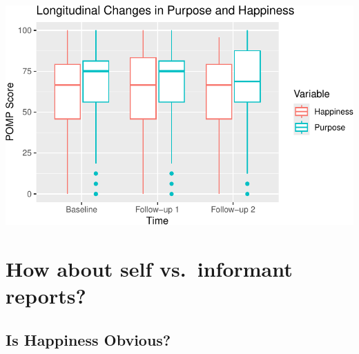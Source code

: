 \documentclass[
  letterpaper,
  DIV=11,
  numbers=noendperiod]{scrartcl}
\newenvironment{Shaded}{\begin{snugshade}}{\end{snugshade}}
\newcommand{\CommentTok}[1]{\textcolor[rgb]{0.37,0.37,0.37}{#1}}
\newcommand{\DecValTok}[1]{\textcolor[rgb]{0.68,0.00,0.00}{#1}}
\newcommand{\FunctionTok}[1]{\textcolor[rgb]{0.28,0.35,0.67}{#1}}
\newcommand{\NormalTok}[1]{\textcolor[rgb]{0.00,0.23,0.31}{#1}}
\newcommand{\OtherTok}[1]{\textcolor[rgb]{0.00,0.23,0.31}{#1}}
\newcommand{\SpecialCharTok}[1]{\textcolor[rgb]{0.37,0.37,0.37}{#1}}
\newcommand{\StringTok}[1]{\textcolor[rgb]{0.13,0.47,0.30}{#1}}
\begin{document}
\includegraphics{purpose_vs_happiness_supplement_files/figure-pdf/longitudinal_changes-1.pdf}

\begin{Shaded}
\end{Shaded}

\section{How about self vs.~informant
reports?}\label{how-about-self-vs.-informant-reports}

\subsection{Is Happiness Obvious?}\label{is-happiness-obvious}
\end{document}
